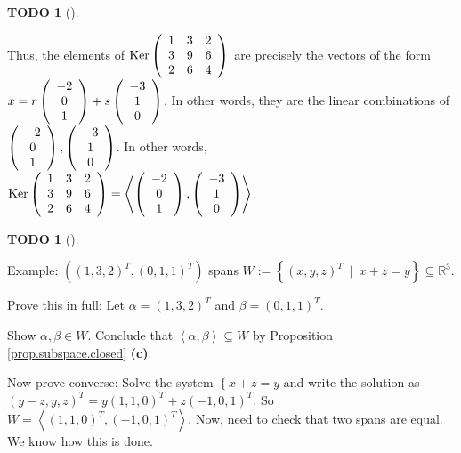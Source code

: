 \documentclass[numbers=enddot,12pt,final,onecolumn,notitlepage]{scrartcl}%
\theoremstyle{definition}
\newtheorem{quest}[theo]{TODO}
\newenvironment{todo}[1][]
{\begin{quest}[#1]\begin{leftbar}}
{\end{leftbar}\end{quest}}
\begin{document}
\begin{todo}
Thus, the elements of $\operatorname*{Ker}\left(
\begin{array}
[c]{ccc}%
1 & 3 & 2\\
3 & 9 & 6\\
2 & 6 & 4
\end{array}
\right)  $ are precisely the vectors of the form $x=r\left(
\begin{array}
[c]{c}%
-2\\
0\\
1
\end{array}
\right)  +s\left(
\begin{array}
[c]{c}%
-3\\
1\\
0
\end{array}
\right)  $. In other words, they are the linear combinations of $\left(
\begin{array}
[c]{c}%
-2\\
0\\
1
\end{array}
\right)  ,\left(
\begin{array}
[c]{c}%
-3\\
1\\
0
\end{array}
\right)  $. In other words, $\operatorname*{Ker}\left(
\begin{array}
[c]{ccc}%
1 & 3 & 2\\
3 & 9 & 6\\
2 & 6 & 4
\end{array}
\right)  =\left\langle \left(
\begin{array}
[c]{c}%
-2\\
0\\
1
\end{array}
\right)  ,\left(
\begin{array}
[c]{c}%
-3\\
1\\
0
\end{array}
\right)  \right\rangle $.
\end{todo}



\begin{todo}
Example: $\left(  \left(  1,3,2\right)  ^{T},\left(  0,1,1\right)
^{T}\right)  $ spans $W:=\left\{  \left(  x,y,z\right)  ^{T}\ \mid
\ x+z=y\right\}  \subseteq\mathbb{R}^{3}$.

Prove this in full: Let $\alpha=\left(  1,3,2\right)  ^{T}$ and $\beta=\left(
0,1,1\right)  ^{T}$.

Show $\alpha,\beta\in W$. Conclude that $\left\langle \alpha,\beta
\right\rangle \subseteq W$ by Proposition \ref{prop.subspace.closed}
\textbf{(c)}.

Now prove converse: Solve the system $\left\{  x+z=y\right.  $ and write the
solution as $\left(  y-z,y,z\right)  ^{T}=y\left(  1,1,0\right)  ^{T}+z\left(
-1,0,1\right)  ^{T}$. So $W=\left\langle \left(  1,1,0\right)  ^{T},\left(
-1,0,1\right)  ^{T}\right\rangle $. Now, need to check that two spans are
equal. We know how this is done.
\end{todo}
\end{document}
